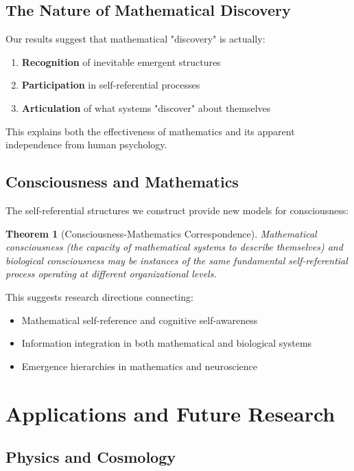 \documentclass[12pt]{article}
\theoremstyle{plain}
\newtheorem{theorem}{Theorem}[section]
\theoremstyle{definition}
\begin{document}
\subsection{The Nature of Mathematical Discovery}

Our results suggest that mathematical "discovery" is actually:

\begin{enumerate}
\item \textbf{Recognition} of inevitable emergent structures
\item \textbf{Participation} in self-referential processes  
\item \textbf{Articulation} of what systems "discover" about themselves
\end{enumerate}

This explains both the effectiveness of mathematics and its apparent independence from human psychology.

\subsection{Consciousness and Mathematics}

The self-referential structures we construct provide new models for consciousness:

\begin{theorem}[Consciousness-Mathematics Correspondence]
Mathematical consciousness (the capacity of mathematical systems to describe themselves) and biological consciousness may be instances of the same fundamental self-referential process operating at different organizational levels.
\end{theorem}

This suggests research directions connecting:
\begin{itemize}
\item Mathematical self-reference and cognitive self-awareness
\item Information integration in both mathematical and biological systems
\item Emergence hierarchies in mathematics and neuroscience
\end{itemize}

\section{Applications and Future Research}

\subsection{Physics and Cosmology}
\end{document}
